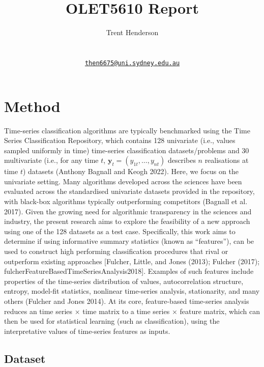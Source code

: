 \documentclass{article}
\title{OLET5610 Report}
\author{
    Trent Henderson
   \\
     \\
   \\
  \texttt{\href{mailto:then6675@uni.sydney.edu.au}{\nolinkurl{then6675@uni.sydney.edu.au}}} \\
  }
\begin{document}
\maketitle

\def\tightlist{}


\begin{abstract}

\end{abstract}


\hypertarget{method}{%
\section{Method}\label{method}}

Time-series classification algorithms are typically benchmarked using
the Time Series Classification Repository, which contains 128 univariate
(i.e., values sampled uniformly in time) time-series classification
datasets/problems and 30 multivariate (i.e., for any time \(t\),
\(\mathbf{y}_{t} = (y_{1t},\ldots, y_{nt})\) describes \(n\)
realisations at time \(t\)) datasets (Anthony Bagnall and Keogh 2022).
Here, we focus on the univariate setting. Many algorithms developed
across the sciences have been evaluated across the standardised
univariate datasets provided in the repository, with black-box
algorithms typically outperforming competitors (Bagnall et al. 2017).
Given the growing need for algorithmic transparency in the sciences and
industry, the present research aims to explore the feasibility of a new
approach using one of the 128 datasets as a test case. Specifically,
this work aims to determine if using informative summary statistics
(known as ``features''), can be used to construct high performing
classification procedures that rival or outperform existing approaches
{[}Fulcher, Little, and Jones (2013); Fulcher (2017);
fulcherFeatureBasedTimeSeriesAnalysis2018{]}. Examples of such features
include properties of the time-series distribution of values,
autocorrelation structure, entropy, model-fit statistics, nonlinear
time-series analysis, stationarity, and many others (Fulcher and Jones
2014). At its core, feature-based time-series analysis reduces an time
series \(\times\) time matrix to a time series \(\times\) feature
matrix, which can then be used for statistical learning (such as
classification), using the interpretative values of time-series features
as inputs.

\hypertarget{dataset}{%
\subsection{Dataset}\label{dataset}}
\end{document}
